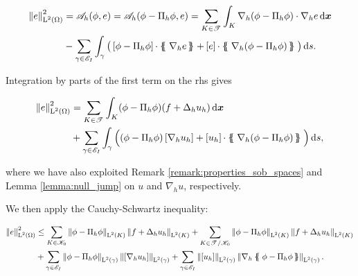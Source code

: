\documentclass[a4paper,11pt]{article}
\begin{document}
{\begin{equation}
\begin{split}
\Norm{e}^2_{\leb{2}(\Omega)} &=  \cA_{h}(\phi,e) = \cA_{h}(\phi - \Pi_{h} \phi,e) = \sum_{K \in \T{}} \int_{K} \nabla_{h} (\phi - \Pi_{h} \phi) \cdot \nabla_{h} e \d \vec{x} \\
  & - \sum_{\gamma \in \cE_{I}}\int_{\gamma} \big( \jump{\phi - \Pi_{h} \phi} \cdot \avg{\nabla_{h}e} + \jump{e} \cdot \avg{\nabla_{h}(\phi - \Pi_{h} \phi)} \big) \d s.   
\end{split}
\label{eq:l2-a-posteriori-estimate}
\end{equation}


Integration by parts of the first term on the rhs gives 

\begin{equation*}
\begin{split}
\Norm{e}^2_{\leb{2}(\Omega)} &= \sum_{K \in \T{}} \int_{K} (\phi - \Pi_{h} \phi) (f + \Delta_{h} u_{h}) \d \vec{x} \\
&+ \sum_{\gamma \in \cE_{I}} \int_{\gamma} \Big( (\phi - \Pi_{h} \phi) \jump{\nabla_{h} u_{h}} + \jump{u_{h}} \cdot \avg{\nabla_{h}(\phi - \Pi_{h} \phi)} \Big ) \d s,
\end{split}
\end{equation*}

where we have also exploited Remark \ref{remark:properties_sob_spaces} and Lemma \ref{lemma:null_jump} on $u$ and $\nabla_{h} u$, respectively. 

We then apply the Cauchy-Schwartz inequality:

\begin{equation}
\begin{split}
\Norm{e}^2_{\leb{2}(\Omega)} &\leq  \sum_{K \in \cK_{0}} \Norm{\phi -  \Pi_{h}\phi}_{\leb{2}(K)} \Norm{f + \Delta_{h} u_{h}}_{\leb{2}(K)} + \sum_{K \in \T{} \slash \cK_{0}} \Norm{\phi -  \Pi_{h}\phi}_{\leb{2}(K)} \Norm{f + \Delta_{h} u_{h}}_{\leb{2}(K)} \\
&+ \sum_{\gamma \in \cE_{I}}  \Norm{\phi -  \Pi_{h}\phi}_{\leb{2}(\gamma)}\Norm{\jump{\nabla_{h} u_{h}}}_{\leb{2}(\gamma)} + \sum_{\gamma \in \cE_{I}} \Norm{\jump{u_{h}}}_{\leb{2}(\gamma)} \Norm{\nabla_{h} \avg{\phi -  \Pi_{h}\phi}}_{\leb{2}(\gamma)}.
\end{split}
\label{a-posteriori-ineq}
\end{equation}

}
\end{document}
